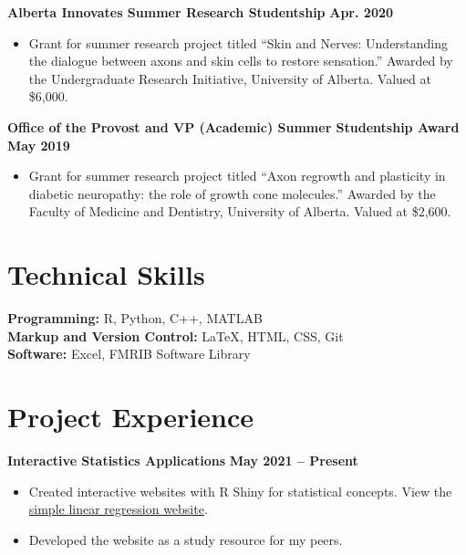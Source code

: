 \documentclass{article}
\begin{document}
\textbf{Alberta Innovates Summer Research Studentship} \hfill \textbf{Apr. 2020}
\begin{itemize}
    \item Grant for summer research project titled ``Skin and Nerves: Understanding the dialogue between axons and skin cells to restore sensation.'' Awarded by the Undergraduate Research Initiative, University of Alberta. Valued at \$6,000.
\end{itemize}
\textbf{Office of the Provost and VP (Academic) Summer Studentship Award} \hfill \textbf{May 2019}
    \begin{itemize}
        \item Grant for summer research project titled ``Axon regrowth and plasticity in diabetic neuropathy: the role of growth cone molecules.'' Awarded by the Faculty of Medicine and Dentistry, University of Alberta. Valued at \$2,600.
    \end{itemize}


\section*{\textcolor{my_colour}{Technical Skills}}
\vspace{-.25em} \hrulefill \vspace{.75em}

\textbf{Programming:} R, Python, C++, MATLAB \\
\textbf{Markup and Version Control:} \LaTeX, HTML, CSS, Git \\
\textbf{Software:} Excel, FMRIB Software Library


\section*{\textcolor{my_colour}{Project Experience}}
\vspace{-.25em} \hrulefill \vspace{.75em}

\textbf{Interactive Statistics Applications} \hfill \textbf{May 2021 -- Present}
\begin{itemize}
    \item Created interactive websites with R Shiny for statistical concepts. View the \href{https://intro-stats.shinyapps.io/slreg/}{simple linear regression website}.
    \item Developed the website as a study resource for my peers.
\end{itemize}
\end{document}
